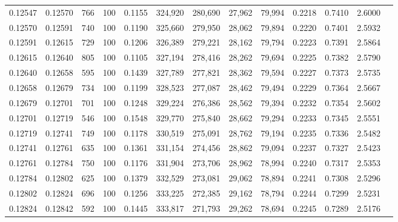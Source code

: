 \begin{tabular}{rrrrrrrrrrrrr}
0.12547 & 0.12570 &   766 & 100 &                                     0.1155 & 324,920 & 280,690 &  27,962 &  79,994 & 0.2218 & 0.7410 & 2.6000 \\
0.12570 & 0.12591 &   740 & 100 &                                     0.1190 & 325,660 & 279,950 &  28,062 &  79,894 & 0.2220 & 0.7401 & 2.5932 \\
0.12591 & 0.12615 &   729 & 100 &                                     0.1206 & 326,389 & 279,221 &  28,162 &  79,794 & 0.2223 & 0.7391 & 2.5864 \\
0.12615 & 0.12640 &   805 & 100 &                                     0.1105 & 327,194 & 278,416 &  28,262 &  79,694 & 0.2225 & 0.7382 & 2.5790 \\
0.12640 & 0.12658 &   595 & 100 &                                     0.1439 & 327,789 & 277,821 &  28,362 &  79,594 & 0.2227 & 0.7373 & 2.5735 \\
0.12658 & 0.12679 &   734 & 100 &                                     0.1199 & 328,523 & 277,087 &  28,462 &  79,494 & 0.2229 & 0.7364 & 2.5667 \\
0.12679 & 0.12701 &   701 & 100 &                                     0.1248 & 329,224 & 276,386 &  28,562 &  79,394 & 0.2232 & 0.7354 & 2.5602 \\
0.12701 & 0.12719 &   546 & 100 &                                     0.1548 & 329,770 & 275,840 &  28,662 &  79,294 & 0.2233 & 0.7345 & 2.5551 \\
0.12719 & 0.12741 &   749 & 100 &                                     0.1178 & 330,519 & 275,091 &  28,762 &  79,194 & 0.2235 & 0.7336 & 2.5482 \\
0.12741 & 0.12761 &   635 & 100 &                                     0.1361 & 331,154 & 274,456 &  28,862 &  79,094 & 0.2237 & 0.7327 & 2.5423 \\
0.12761 & 0.12784 &   750 & 100 &                                     0.1176 & 331,904 & 273,706 &  28,962 &  78,994 & 0.2240 & 0.7317 & 2.5353 \\
0.12784 & 0.12802 &   625 & 100 &                                     0.1379 & 332,529 & 273,081 &  29,062 &  78,894 & 0.2241 & 0.7308 & 2.5296 \\
0.12802 & 0.12824 &   696 & 100 &                                     0.1256 & 333,225 & 272,385 &  29,162 &  78,794 & 0.2244 & 0.7299 & 2.5231 \\
0.12824 & 0.12842 &   592 & 100 &                                     0.1445 & 333,817 & 271,793 &  29,262 &  78,694 & 0.2245 & 0.7289 & 2.5176 \\

\end{tabular}
